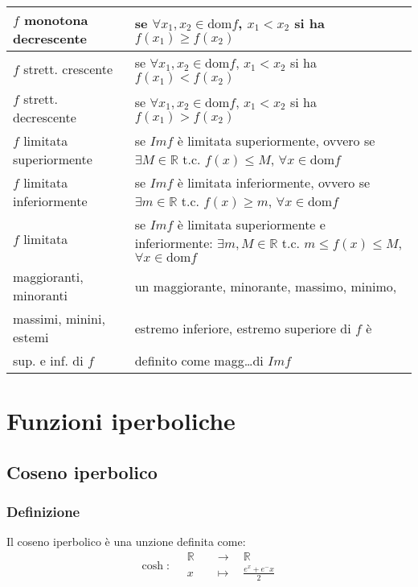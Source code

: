 \documentclass[a4paper]{article}
\newcommand\dom{\text{dom}}
\begin{document}
\begin{center}
\begin{tabularx}{\textwidth}{l X}
		\midrule
		\(f\) monotona decrescente & se \(\forall x_1, x_2 \in \dom f\), \(x_1 < x_2\) si ha \(f(x_1) \geq f(x_2)\) \\
		\midrule
		\(f\) strett. crescente & se \(\forall x_1, x_2 \in \dom f\), \(x_1 < x_2\) si ha \(f(x_1) < f(x_2)\) \\
		\midrule
		\(f\) strett. decrescente & se \(\forall x_1, x_2 \in \dom f\), \(x_1 < x_2\) si ha \(f(x_1) > f(x_2)\) \\
		\midrule
		\(f\) limitata superiormente & se \(Imf\) è limitata superiormente, ovvero se \(\exists M \in \mathbb{R}\) t.c. \(f(x) \leq M\), \(\forall x \in \dom f\) \\
		\midrule
		\(f\) limitata inferiormente & se \(Imf\) è limitata inferiormente, ovvero se \(\exists m \in \mathbb{R}\) t.c. \(f(x) \geq m\), \(\forall x \in \dom f\) \\
		\midrule
		\(f\) limitata & se \(Imf\) è limitata superiormente e inferiormente: \(\exists m, M \in \mathbb{R}\) t.c. \(m \leq f(x) \leq M\), \(\forall x \in \dom f\) \\
		\midrule
		maggioranti, minoranti & un maggiorante, minorante, massimo, minimo, \\
		massimi, minini, estemi & estremo inferiore, estremo superiore di \(f\) è \\
		sup. e inf. di \(f\) & definito come magg\dots di \(Im f\) \\
		\bottomrule
	\end{tabularx}
\end{center}

\newpage

\section{Funzioni iperboliche}
\subsection{Coseno iperbolico}
\subsubsection*{Definizione}
Il coseno iperbolico è una unzione definita come:
\[\cosh : \quad
\begin{aligned}
	\mathbb{R} \quad &\to \quad \mathbb{R} \\
	x \quad &\mapsto \quad \frac{e^x + e^-x}{2}
\end{aligned}
\]
\end{document}
